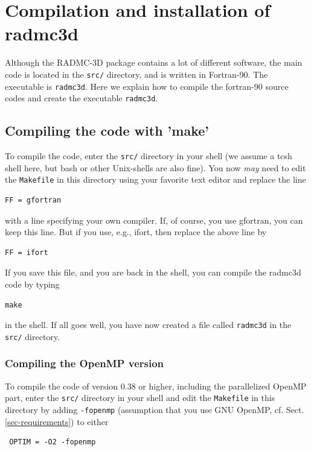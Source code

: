 \documentclass{report}
\begin{document}
\chapter{Compilation and installation of radmc3d}
\label{chap-compilation}
% 
Although the RADMC-3D package contains a lot of different software,
the main code is located in the {\small\tt src/} directory, and is
written in Fortran-90. The executable is {\small\tt radmc3d}. Here
we explain how to compile the fortran-90 source codes and create 
the executable {\small\tt radmc3d}.


\section{Compiling the code with 'make'}\label{sec-makeing}
To compile the code, enter the {\small\tt src/} directory in your shell (we assume
a tcsh shell here, but bash or other Unix-shells are also fine). You now
{\em may} need to edit the {\small\tt Makefile} in this directory using your favorite
text editor and replace the line
{\small\begin{verbatim}
FF = gfortran
\end{verbatim}}
with a line specifying your own compiler. If, of course, you use gfortran,
you can keep this line. But if you use, e.g., ifort, then replace the above
line by
{\small\begin{verbatim}
FF = ifort
\end{verbatim}}
If you save this file, and you are back in the shell, you can compile the
radmc3d code by typing
{\small\begin{verbatim}
make
\end{verbatim}}
in the shell. If all
goes well, you have now created a file called {\small\tt radmc3d} in the {\small\tt
  src/} directory.

\subsection{Compiling the OpenMP version}\label{sec-makeomp}  
To compile the code of version 0.38 or higher, including the parallelized
OpenMP part, enter the {\small\tt src/} directory in your shell and edit the
{\small\tt Makefile} in this directory by adding {\small\tt -fopenmp}
(assumption that you use GNU OpenMP, cf. Sect. \ref{sec-requirements}) to
either {\small\begin{verbatim} OPTIM = -O2 -fopenmp
\end{verbatim}}
\end{document}
